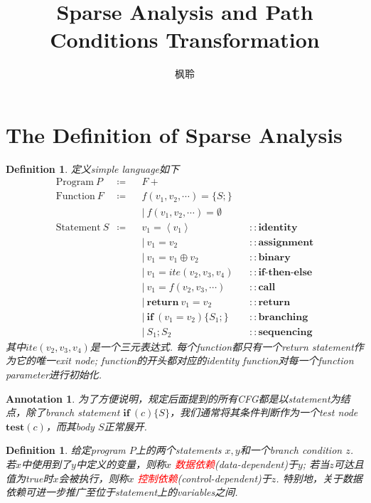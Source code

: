 \documentclass{article}
\newtheorem{definition}[theorem]{Definition}
\newtheorem{annotation}[theorem]{Annotation}
\newcommand{\redt}[1]{\textcolor{red}{#1}}
\newcommand{\abracket}[1]{\ensuremath{\left< #1 \right>}}
\begin{document}
\title{Sparse Analysis and Path Conditions Transformation}
\author{枫聆}
\maketitle
\tableofcontents

\newpage
\section{The Definition of Sparse Analysis}

\begin{definition}
\rm 定义simple language如下
$$
\begin{aligned}
\text{Program}~P & \coloneqq && F+ \\
\text{Function}~F  & \coloneqq &&  f(v_1,v_2,\cdots) = \{S;\} \\
&&& |~f(v_1,v_2,\cdots) = \emptyset \\
\text{Statement}~S & \coloneqq && v_1 = \abracket{v_1} && ::\textbf{identity} \\
&&& |~v_1 = v_2  && ::\textbf{assignment} \\
&&& |~v_1 = v_1 \oplus v_2  && ::\textbf{binary}\\
&&& |~v_1 = ite(v_2,v_3,v_4) && ::\textbf{if-then-else} \\
&&& |~v_1 = f(v_2,v_3,\cdots)  && ::\textbf{call}\\
&&& |~\textbf{return}~ v_1 = v_2  && ::\textbf{return}\\
&&& |~\textbf{if}~(v_1=v_2)\{S_1;\}  && ::\textbf{branching}\\
&&& |~S_1;S_2 && ::\textbf{sequencing}
\end{aligned}
$$
其中$ite(v_2,v_3,v_4)$是一个三元表达式. 每个function都只有一个return statement作为它的唯一exit node; function的开头都对应的identity function对每一个function parameter进行初始化. 
\end{definition}

\begin{annotation}
\rm 为了方便说明，规定后面提到的所有CFG都是以statement为结点，除了branch statement $\textbf{if}~(c)\{S\}$，我们通常将其条件判断作为一个test node $\textbf{test}(c)$，而其body $S$正常展开.    
\end{annotation}

\begin{definition}
\rm 给定program $P$上的两个statements $x,y$和一个branch condition $z$. 若$x$中使用到了$y$中定义的变量，则称$x$ \redt{数据依赖}(data-dependent)于$y$; 若当$z$可达且值为true时$x$会被执行，则称$x$ \redt{控制依赖}(control-dependent)于$z$. 特别地，关于数据依赖可进一步推广至位于statement上的variables之间.
\end{definition}
\end{document}
